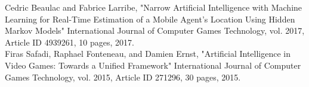 \begin{thebibliography}{1}
Cedric Beaulac and Fabrice Larribe, "Narrow Artificial Intelligence with Machine Learning for Real-Time Estimation of a Mobile Agent’s Location Using Hidden Markov Models" International Journal of Computer Games Technology, vol. 2017, Article ID 4939261, 10 pages, 2017. 
\\

Firas Safadi, Raphael Fonteneau, and Damien Ernst, "Artificial Intelligence in Video Games: Towards a Unified Framework" International Journal of Computer Games Technology, vol. 2015, Article ID 271296, 30 pages, 2015.
\\

\end{thebibliography}